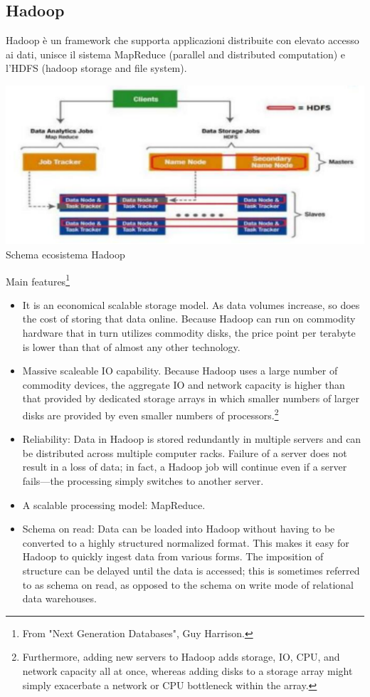 \documentclass[a4page, 11pt]{article}
\begin{document}
\subsection{Hadoop}
Hadoop è un framework che supporta applicazioni distribuite con elevato accesso ai dati, unisce il sistema MapReduce (parallel and distributed computation) e l’HDFS (hadoop storage and file system).
\begin{center}
\includegraphics[scale=0.70]{IMAGE9.png}\\
Schema ecosistema Hadoop
\end{center}
Main features\footnote{From "Next Generation
Databases", Guy Harrison.} %
\begin{itemize}

 \item It is an economical scalable storage model. As data volumes increase, so does the cost of storing that data online.
 Because Hadoop can run on commodity hardware that in turn utilizes commodity disks, the price point per terabyte is lower than that of almost any other technology.
\item Massive scaleable IO capability. Because Hadoop uses a large number of
commodity devices, the aggregate IO and network capacity is higher than that
provided by dedicated storage arrays in which smaller numbers of larger disks are provided by even smaller numbers of processors.\footnote{Furthermore, adding new servers to Hadoop adds storage, IO, CPU, and network capacity all at once, whereas adding disks to a storage array might simply exacerbate a network or CPU bottleneck within the array.}
\item Reliability: Data in Hadoop is stored redundantly in multiple servers and can be distributed across multiple computer racks. Failure of a server does not result in a loss of data; in fact, a Hadoop job will continue even if a server fails—the processing simply switches to another server.
\item A scalable processing model: MapReduce.
\item Schema on read: Data can be loaded into Hadoop without having to be converted
to a highly structured normalized format. This makes it easy for Hadoop to quickly ingest data from various forms. The imposition of structure can be delayed until the data is accessed; this is sometimes referred to as schema on read, as opposed to the schema on write mode of relational data warehouses.
\end{itemize}
\end{document}
